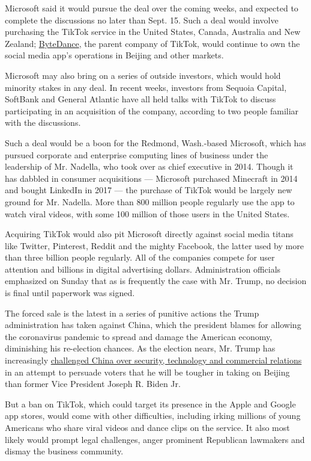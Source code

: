 Microsoft said it would pursue the deal over the coming weeks, and
expected to complete the discussions no later than Sept. 15. Such a deal
would involve purchasing the TikTok service in the United States,
Canada, Australia and New Zealand;
\href{https://www.nytimes3xbfgragh.onion/2020/08/03/technology/tiktok-trump-sale-microsoft.html}{ByteDance},
the parent company of TikTok, would continue to own the social media
app's operations in Beijing and other markets.

Microsoft may also bring on a series of outside investors, which would
hold minority stakes in any deal. In recent weeks, investors from
Sequoia Capital, SoftBank and General Atlantic have all held talks with
TikTok to discuss participating in an acquisition of the company,
according to two people familiar with the discussions.

Such a deal would be a boon for the Redmond, Wash.-based Microsoft,
which has pursued corporate and enterprise computing lines of business
under the leadership of Mr. Nadella, who took over as chief executive in
2014. Though it has dabbled in consumer acquisitions --- Microsoft
purchased Minecraft in 2014 and bought LinkedIn in 2017 --- the purchase
of TikTok would be largely new ground for Mr. Nadella. More than 800
million people regularly use the app to watch viral videos, with some
100 million of those users in the United States.

Acquiring TikTok would also pit Microsoft directly against social media
titans like Twitter, Pinterest, Reddit and the mighty Facebook, the
latter used by more than three billion people regularly. All of the
companies compete for user attention and billions in digital advertising
dollars. Administration officials emphasized on Sunday that as is
frequently the case with Mr. Trump, no decision is final until paperwork
was signed.

The forced sale is the latest in a series of punitive actions the Trump
administration has taken against China, which the president blames for
allowing the coronavirus pandemic to spread and damage the American
economy, diminishing his re-election chances. As the election nears, Mr.
Trump has increasingly
\href{https://www.nytimes3xbfgragh.onion/2020/07/25/world/asia/us-china-trump-xi.html}{challenged
China over security, technology and commercial relations} in an attempt
to persuade voters that he will be tougher in taking on Beijing than
former Vice President Joseph R. Biden Jr.

But a ban on TikTok, which could target its presence in the Apple and
Google app stores, would come with other difficulties, including irking
millions of young Americans who share viral videos and dance clips on
the service. It also most likely would prompt legal challenges, anger
prominent Republican lawmakers and dismay the business community.

